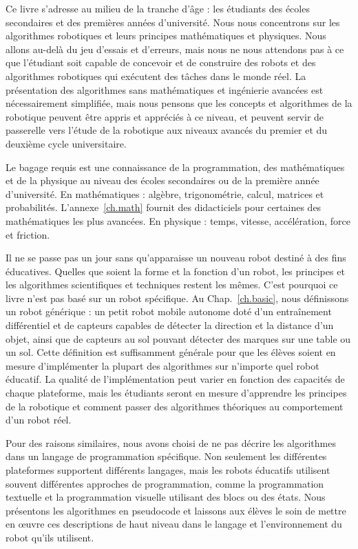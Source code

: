 Ce livre s'adresse au milieu de la tranche d'âge : les étudiants des écoles secondaires et des premières années d'université. Nous nous concentrons sur les algorithmes robotiques et leurs principes mathématiques et physiques. Nous allons au-delà du jeu d'essais et d'erreurs, mais nous ne nous attendons pas à ce que l'étudiant soit capable de concevoir et de construire des robots et des algorithmes robotiques qui exécutent des tâches dans le monde réel. La présentation des algorithmes sans mathématiques et ingénierie avancées est nécessairement simplifiée, mais nous pensons que les concepts et algorithmes de la robotique peuvent être appris et appréciés à ce niveau, et peuvent servir de passerelle vers l'étude de la robotique aux niveaux avancés du premier et du deuxième cycle universitaire.

Le bagage requis est une connaissance de la programmation, des mathématiques et de la physique au niveau des écoles secondaires ou de la première année d'université. En mathématiques : algèbre, trigonométrie, calcul, matrices et probabilités. L'annexe~\ref{ch.math} fournit des didacticiels pour certaines des mathématiques les plus avancées. En physique : temps, vitesse, accélération, force et friction.

Il ne se passe pas un jour sans qu'apparaisse un nouveau robot destiné à des fins éducatives. Quelles que soient la forme et la fonction d'un robot, les principes et les algorithmes scientifiques et techniques restent les mêmes. C'est pourquoi ce livre n'est pas basé sur un robot spécifique. Au Chap.~\ref{ch.basic}, nous définissons un robot générique : un petit robot mobile autonome doté d'un entraînement différentiel et de capteurs capables de détecter la direction et la distance d'un objet, ainsi que de capteurs au sol pouvant détecter des marques sur une table ou un sol. Cette définition est suffisamment générale pour que les élèves soient en mesure d'implémenter la plupart des algorithmes sur n'importe quel robot éducatif. La qualité de l'implémentation peut varier en fonction des capacités de chaque plateforme, mais les étudiants seront en mesure d'apprendre les principes de la robotique et comment passer des algorithmes théoriques au comportement d'un robot réel.

Pour des raisons similaires, nous avons choisi de ne pas décrire les algorithmes dans un langage de programmation spécifique. Non seulement les différentes plateformes supportent différents langages, mais les robots éducatifs utilisent souvent différentes approches de programmation, comme la programmation textuelle et la programmation visuelle utilisant des blocs ou des états. Nous présentons les algorithmes en pseudocode et laissons aux élèves le soin de mettre en œuvre ces descriptions de haut niveau dans le langage et l'environnement du robot qu'ils utilisent.

